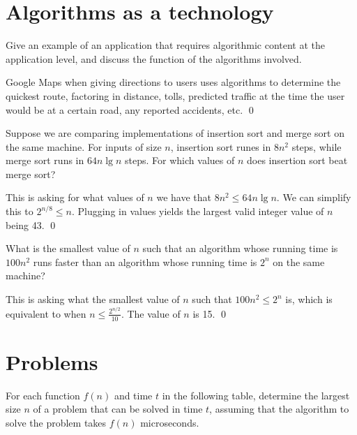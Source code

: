 \section{Algorithms as a technology}
 Give an example of an application that requires algorithmic content at the application level, and discuss the function of the algorithms involved.

\sol Google Maps when giving directions to users uses algorithms to determine the quickest route, factoring in distance, tolls, predicted traffic at the time the user would be at a certain road, any reported accidents, etc. \qed

 Suppose we are comparing implementations of insertion sort and merge sort on the same machine. For inputs of size $n$, insertion sort runes in $8n^2$ steps, while merge sort runs in $64n \lg n$ steps. For which values of $n$ does insertion sort beat merge sort?

\sol This is asking for what values of $n$ we have that $8n^2 \leq 64 n \lg n$. We can simplify this to $2^{n/8} \leq n$. Plugging in values yields the largest valid integer value of $n$ being 43. \qed

 What is the smallest value of $n$ such that an algorithm whose running time is $100n^2$ runs faster than an algorithm whose running time is $2^n$ on the same machine?

\sol This is asking what the smallest value of $n$ such that $100n^2 \leq 2^n$ is, which is equivalent to when $n \leq \frac{2^{n/2}}{10}$. The value of $n$ is 15. \qed

\section{Problems}
 For each function $f(n)$ and time $t$ in the following table, determine the largest size $n$ of a problem that can be solved in time $t$, assuming that the algorithm to solve the problem takes $f(n)$ microseconds.

\sol \,

\,

